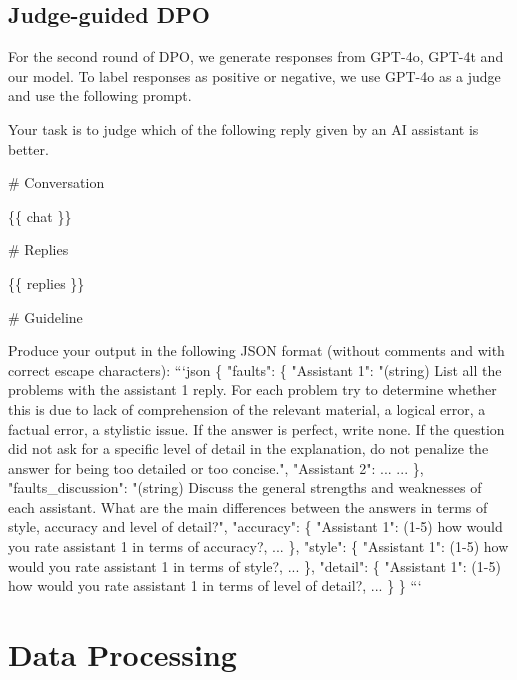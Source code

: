 \documentclass[11pt]{article}
\begin{document}
\subsection{Judge-guided DPO}
For the second round of DPO, we generate responses from GPT-4o, GPT-4t and our model. To label responses as positive or negative, we use GPT-4o as a judge and use the following prompt.
\begin{HighlightVerbatim}
Your task is to judge which of the following reply given by an AI assistant is better.

# Conversation

\{\{ chat \}\}

# Replies

\{\{ replies \}\}

# Guideline

Produce your output in the following JSON format (without comments and with correct escape characters):
```json
\{
    "faults": \{
       "Assistant 1": "(string) List all the problems with the assistant 1 reply. For each problem try to determine whether this is due to lack of comprehension of the relevant material, a logical error, a factual error, a stylistic issue. If the answer is perfect, write none. If the question did not ask for a specific level of detail in the explanation, do not penalize the answer for being too detailed or too concise.",
       "Assistant 2": ...
       ...
    \},
    "faults_discussion": "(string) Discuss the general strengths and weaknesses of each assistant. What are the main differences between the answers in terms of style, accuracy and level of detail?",
    "accuracy": \{
       "Assistant 1": (1-5) how would you rate assistant 1 in terms of accuracy?,
        ...
    \},
    "style": \{
       "Assistant 1": (1-5) how would you rate assistant 1 in terms of style?,
        ...
    \},
    "detail": \{
       "Assistant 1": (1-5) how would you rate assistant 1 in terms of level of detail?,
        ...
    \}
\}
```
\end{HighlightVerbatim}


\section{Data Processing} \label{sec:data_processing}
\end{document}
